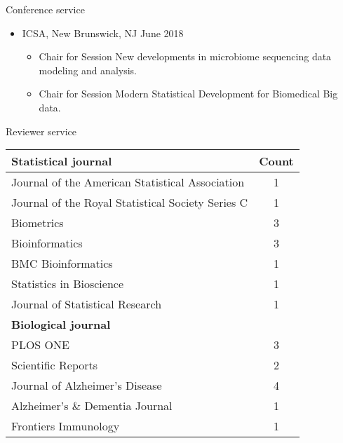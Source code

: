 \documentclass{resume} %
\begin{document}

\begin{rSection}{Conference service}

\begin{itemize}[noitemsep,topsep=0pt]

\item  ICSA, New Brunswick, NJ  \hfill {June 2018}
\begin{itemize}[noitemsep,topsep=0pt]
\item{Chair for Session New developments in microbiome sequencing data modeling and analysis.}
\item{Chair for Session Modern Statistical Development for Biomedical Big data.}
\end{itemize}


\end{itemize}

\end{rSection}


\begin{rSection}{Reviewer service}

\begin{table}[htp]
\begin{center}
\begin{tabular}{l c }
\hline
\hline
\bf{Statistical journal} & Count \\
\hline
Journal of the American Statistical Association & 1 \\
Journal of the Royal Statistical Society Series C & 1 \\
Biometrics & 3 \\
Bioinformatics & 3 \\
BMC Bioinformatics & 1 \\
Statistics in Bioscience & 1 \\
Journal of Statistical Research & 1 \\
\hline
\hline
\bf{Biological journal} &  \\
\hline
PLOS ONE & 3 \\
Scientific Reports & 2 \\
Journal of Alzheimer's Disease & 4 \\
Alzheimer's \& Dementia Journal & 1 \\
Frontiers Immunology & 1 \\
\hline
\hline
\end{tabular}
\end{center}
\label{default}
\end{table}%


\end{rSection}
\end{document}
